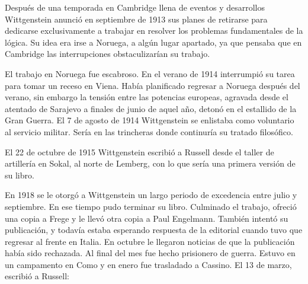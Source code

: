 Después de una temporada en Cambridge llena de eventos y desarrollos
Wittgenstein anunció en septiembre de 1913 sus planes de retirarse para
dedicarse exclusivamente a trabajar en resolver los problemas fundamentales de
la lógica. Su idea era irse a Noruega, a algún lugar apartado, ya que pensaba
que en Cambridge las interrupciones obstaculizarían su trabajo.\autocite[cap. 4
loc 1844]{monk}


El trabajo en Noruega fue escabroso. En el verano de 1914 interrumpió su tarea
para tomar un receso en Viena.\autocite[cap. 5 loc 2154]{monk} Había planificado
regresar a Noruega después del verano, sin embargo la tensión entre las
potencias europeas, agravada desde el atentado de Sarajevo a finales de junio de
aquel año, detonó en el estallido de la Gran Guerra. El 7 de agosto de 1914
Wittgenstein se enlistaba como voluntario al servicio militar. Sería en las
trincheras donde continuría su tratado filosófico.

El 22 de octubre de 1915 Wittgenstein escribió a Russell desde el taller de
artillería en Sokal, al norte de Lemberg, con lo que sería una primera versión
de su libro.\autocite[cf. p.84]{cambridgeletters} 

En 1918 se le otorgó a Wittgenstein un largo periodo de excedencia entre julio y
septiembre. En ese tiempo pudo terminar su libro. Culminado el trabajo, ofreció
una copia a Frege y le llevó otra copia a Paul Engelmann. También intentó su
publicación, y todavía estaba esperando respuesta de la editorial cuando tuvo
que regresar al frente en Italia. En octubre le llegaron noticias de que la
publicación había sido rechazada. Al final del mes fue hecho prisionero de
guerra. Estuvo en un campamento en Como y en enero fue trasladado a Cassino. El
13 de marzo, escribió a Russell\autocite[cf. p.268]{mcguinness}: 

